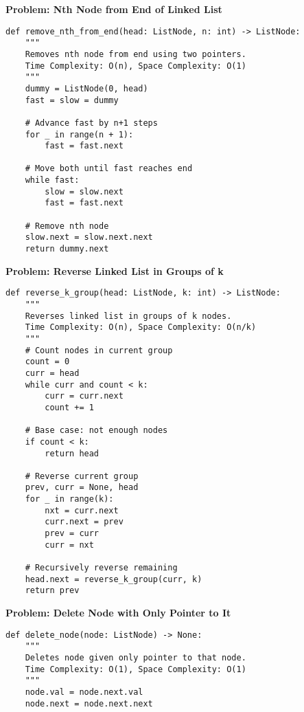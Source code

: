 \noindent\textbf{Problem: Nth Node from End of Linked List}
\begin{verbatim}
def remove_nth_from_end(head: ListNode, n: int) -> ListNode:
    """
    Removes nth node from end using two pointers.
    Time Complexity: O(n), Space Complexity: O(1)
    """
    dummy = ListNode(0, head)
    fast = slow = dummy
    
    # Advance fast by n+1 steps
    for _ in range(n + 1):
        fast = fast.next
    
    # Move both until fast reaches end
    while fast:
        slow = slow.next
        fast = fast.next
    
    # Remove nth node
    slow.next = slow.next.next
    return dummy.next
\end{verbatim}

\noindent\textbf{Problem: Reverse Linked List in Groups of k}
\begin{verbatim}
def reverse_k_group(head: ListNode, k: int) -> ListNode:
    """
    Reverses linked list in groups of k nodes.
    Time Complexity: O(n), Space Complexity: O(n/k)
    """
    # Count nodes in current group
    count = 0
    curr = head
    while curr and count < k:
        curr = curr.next
        count += 1
    
    # Base case: not enough nodes
    if count < k:
        return head
    
    # Reverse current group
    prev, curr = None, head
    for _ in range(k):
        nxt = curr.next
        curr.next = prev
        prev = curr
        curr = nxt
    
    # Recursively reverse remaining
    head.next = reverse_k_group(curr, k)
    return prev
\end{verbatim}

\noindent\textbf{Problem: Delete Node with Only Pointer to It}
\begin{verbatim}
def delete_node(node: ListNode) -> None:
    """
    Deletes node given only pointer to that node.
    Time Complexity: O(1), Space Complexity: O(1)
    """
    node.val = node.next.val
    node.next = node.next.next
\end{verbatim}

